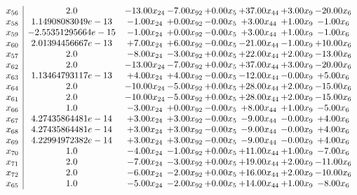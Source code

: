\documentclass[8pt]{article}
\begin{document}
\[\begin{array}{c| c c@{\hskip 2pt} c@{\hskip 2pt} c@{\hskip 2pt} c@{\hskip 2pt} c@{\hskip 2pt} c@{\hskip 2pt} }
 x_{56}   &  2.0 & -13.00 x_{24} & -7.00 x_{92} & +  0.00 x_{5} & + 37.00 x_{44} & +  3.00 x_{9} & -20.00 x_{6}\\
 x_{58}   &  1.14908083049e-13 & -1.00 x_{24} & +  0.00 x_{92} & -0.00 x_{5} & +  3.00 x_{44} & +  1.00 x_{9} & -1.00 x_{6}\\
 x_{59}   &  -2.55351295664e-15 & -1.00 x_{24} & +  0.00 x_{92} & -0.00 x_{5} & +  3.00 x_{44} & +  1.00 x_{9} & -1.00 x_{6}\\
 x_{60}   &  2.01394456667e-13 & +  7.00 x_{24} & +  6.00 x_{92} & -0.00 x_{5} & -21.00 x_{44} & -1.00 x_{9} & + 10.00 x_{6}\\
 x_{57}   &  2.0 & -8.00 x_{24} & -3.00 x_{92} & +  0.00 x_{5} & + 22.00 x_{44} & +  2.00 x_{9} & -13.00 x_{6}\\
 x_{62}   &  2.0 & -13.00 x_{24} & -7.00 x_{92} & +  0.00 x_{5} & + 37.00 x_{44} & +  3.00 x_{9} & -20.00 x_{6}\\
 x_{63}   &  1.13464793117e-13 & +  4.00 x_{24} & +  4.00 x_{92} & -0.00 x_{5} & -12.00 x_{44} & -0.00 x_{9} & +  5.00 x_{6}\\
 x_{64}   &  2.0 & -10.00 x_{24} & -5.00 x_{92} & +  0.00 x_{5} & + 28.00 x_{44} & +  2.00 x_{9} & -15.00 x_{6}\\
 x_{61}   &  2.0 & -10.00 x_{24} & -5.00 x_{92} & +  0.00 x_{5} & + 28.00 x_{44} & +  2.00 x_{9} & -15.00 x_{6}\\
 x_{66}   &  1.0 & -3.00 x_{24} & +  0.00 x_{92} & -0.00 x_{5} & +  8.00 x_{44} & +  1.00 x_{9} & -5.00 x_{6}\\
 x_{67}   &  4.27435864481e-14 & +  3.00 x_{24} & +  3.00 x_{92} & -0.00 x_{5} & -9.00 x_{44} & -0.00 x_{9} & +  4.00 x_{6}\\
 x_{68}   &  4.27435864481e-14 & +  3.00 x_{24} & +  3.00 x_{92} & -0.00 x_{5} & -9.00 x_{44} & -0.00 x_{9} & +  4.00 x_{6}\\
 x_{69}   &  4.22994972382e-14 & +  3.00 x_{24} & +  3.00 x_{92} & -0.00 x_{5} & -9.00 x_{44} & -0.00 x_{9} & +  4.00 x_{6}\\
 x_{70}   &  1.0 & -4.00 x_{24} & -1.00 x_{92} & +  0.00 x_{5} & + 11.00 x_{44} & +  1.00 x_{9} & -7.00 x_{6}\\
 x_{71}   &  2.0 & -7.00 x_{24} & -3.00 x_{92} & +  0.00 x_{5} & + 19.00 x_{44} & +  2.00 x_{9} & -11.00 x_{6}\\
 x_{72}   &  2.0 & -6.00 x_{24} & -2.00 x_{92} & +  0.00 x_{5} & + 16.00 x_{44} & +  2.00 x_{9} & -10.00 x_{6}\\
 x_{65}   &  1.0 & -5.00 x_{24} & -2.00 x_{92} & +  0.00 x_{5} & + 14.00 x_{44} & +  1.00 x_{9} & -8.00 x_{6}\\

\end{array}\]
\end{document}
